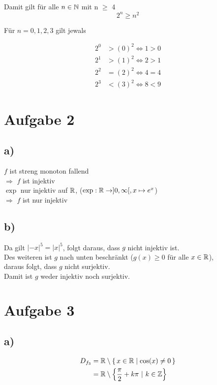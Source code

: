\documentclass[a4paper, 11pt]{article}
\begin{document}
Damit gilt für alle \(n \in \mathbb{N}\) mit n \(\ge\) 4
$$ 2^n \geq n^2 $$

Für \(n = 0, 1, 2, 3\) gilt jewals

\begin{align*}
    2^0 &> (0)^2 \Leftrightarrow 1 > 0 \\
    2^1 &> (1)^2 \Leftrightarrow 2 > 1 \\
    2^2 &= (2)^2 \Leftrightarrow 4 = 4 \\
    2^3 &< (3)^2 \Leftrightarrow 8 < 9
\end{align*}

\section{Aufgabe 2}
\label{sec:org82bf1f4}
\subsection{a)}
\label{sec:org0ed2016}
\(f\) ist streng monoton fallend \\
\(\Rightarrow\) \(f\) ist injektiv \\

\(\exp\) nur injektiv auf \(\mathbb{R}\), (\(\exp : \mathbb{R} \rightarrow ]0, \infty[, x \mapsto e^x\))\\
\(\Rightarrow\) \(f\) ist nur injektiv

\subsection{b)}
\label{sec:org64fd33e}
Da gilt \(|-x|^5 = |x|^5\), folgt daraus, dass \(g\) nicht injektiv ist. \\
Des weiteren ist \(g\) nach unten beschränkt (\(g(x) \geq 0\) für alle \(x \in \mathbb{R}\)), \\
daraus folgt, dass \(g\) nicht surjektiv. \\
Damit ist \(g\) weder injektiv noch surjektiv.

\section{Aufgabe 3}
\label{sec:org0e6b1b8}
\subsection{a)}
\label{sec:org7aeab8c}
\begin{align*}
    D_{f_3} &= \mathbb{R} \setminus \set{x \in \mathbb{R}| \cos(x) \neq 0} \\
    &= \mathbb{R} \setminus \left\{ \frac{\pi}{2} + k\pi \text{ | } k \in \mathbb{Z} \right\}
\end{align*}
\end{document}
